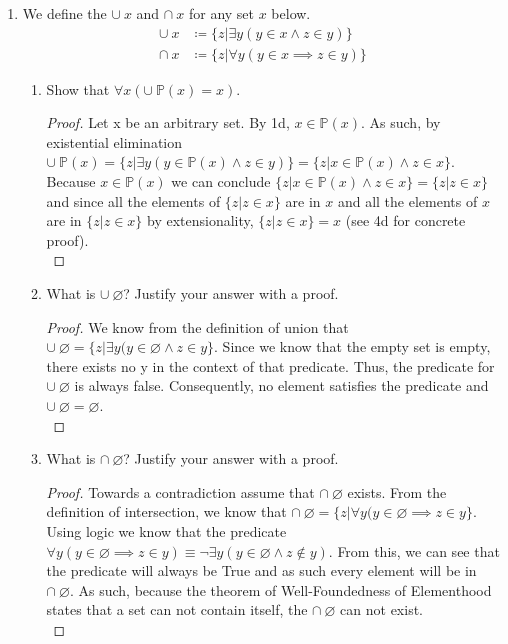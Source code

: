 \documentclass{article}
\newcommand{\Emptyset}{\varnothing}
\newcommand{\union}{\cup\:}
\newcommand{\intersect}{\cap\:}
\newcommand{\defeq}{\coloneqq}
\begin{document}
\begin{enumerate}
\begin{enumerate}
\begin{proof}
      \end{proof}
    \end{enumerate}
\pagebreak
    \item
    We define the $\union x$ and $\intersect x$ for any set $x$ below.
    \begin{align*}
      \union x &\defeq \{z | \exists y (y \in x \land z \in y)\} \\
      \intersect x &\defeq \{z | \forall y (y \in x \implies z \in y)\}
    \end{align*}
    \begin{enumerate}
      \item Show that $\forall x (\union \mathbb{P}(x) = x)$.
        \begin{proof}
        Let x be an arbitrary set. By 1d, $x \in \mathbb{P}(x)$. As such, by existential elimination $\union \mathbb{P}(x)=\{z | \exists y (y \in \mathbb{P}(x) \land z \in y)\}=\{z|x \in \mathbb{P}(x) \land z \in x\}$. Because $x \in \mathbb{P}(x)$ we can conclude $\{z|x \in \mathbb{P}(x) \land z \in x\}=\{z|z \in x\}$ and since all the elements of $\{z|z \in x\}$ are in $x$ and all the elements of $x$ are in $\{z|z \in x\}$ by extensionality, $\{z|z \in x\}=x$ (see 4d for concrete proof).\\
        \end{proof}
      \item What is $\union \Emptyset$? Justify your answer with a proof.
      \begin{proof}
        We know from the definition of union that $\union \Emptyset = \{z|\exists y (y \in \Emptyset \land z \in y\}$. Since we know that the empty set is empty, there exists no y in the context of that predicate. Thus, the predicate for $\union \Emptyset$ is always false. Consequently, no element satisfies the predicate and $\union \Emptyset = \Emptyset$.\\
      \end{proof}
      \item What is $\intersect \Emptyset$? Justify your answer with a proof.
      \begin{proof}
        Towards a contradiction assume that $\intersect \Emptyset$ exists. From the definition of intersection, we know that $\intersect \Emptyset = \{z|\forall y (y \in \Emptyset \implies z \in y\}$. Using logic we know that the predicate $\forall y (y \in \Emptyset \implies z \in y) \equiv \neg\exists y (y \in \Emptyset \land z \notin y)$. From this, we can see that the predicate will always be True and as such every element will be in $\intersect \Emptyset$. As such, because the theorem of Well-Foundedness of Elementhood states that a set can not contain itself, the $\intersect \Emptyset$ can not exist. \\

\end{proof}
\end{enumerate}
\end{enumerate}
\end{document}
